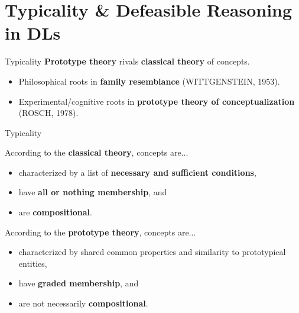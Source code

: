 \documentclass[10pt]{beamer}
\begin{document}
\section{Typicality \& Defeasible Reasoning in DLs}       %

\begin{frame}{Typicality}
  \textbf{Prototype theory} rivals \textbf{classical theory} of concepts.
\begin{itemize}
  \item Philosophical roots in \textbf{family resemblance} (WITTGENSTEIN, 1953).
  \item Experimental/cognitive roots in \textbf{prototype theory of conceptualization} (ROSCH, 1978).
\end{itemize}
\end{frame}

\begin{frame}[fragile]{Typicality}
  
  According to the \textbf{classical theory}, concepts are... 
  \begin{itemize}
    \item characterized by a list of \textbf{necessary and sufficient conditions},
    \item have \textbf{all or nothing membership}, and
    \item are \textbf{compositional}.
  \end{itemize} \pause 

  According to the \textbf{prototype theory}, concepts are... 
  \begin{itemize}
    \item characterized by shared common properties and similarity to prototypical entities,
    \item have \textbf{graded membership}, and
    \item are not necessarily \textbf{compositional}.
  \end{itemize} 

\end{frame}
\end{document}
